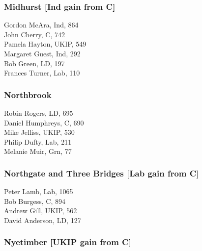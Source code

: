 \documentclass[a4paper,openany,10pt]{book}
\begin{document}
\subsubsection*{Midhurst \hspace*{\fill}\nolinebreak[1]%
\enspace\hspace*{\fill}
[Ind gain from C]}



Gordon McAra, Ind, 864\\
John Cherry, C, 742\\
Pamela Hayton, UKIP, 549\\
Margaret Guest, Ind, 292\\
Bob Green, LD, 197\\
Frances Turner, Lab, 110\\


\subsubsection*{Northbrook}



Robin Rogers, LD, 695\\
Daniel Humphreys, C, 690\\
Mike Jelliss, UKIP, 530\\
Philip Dufty, Lab, 211\\
Melanie Muir, Grn, 77\\


\subsubsection*{Northgate and Three Bridges \hspace*{\fill}\nolinebreak[1]%
\enspace\hspace*{\fill}
[Lab gain from C]}



Peter Lamb, Lab, 1065\\
Bob Burgess, C, 894\\
Andrew Gill, UKIP, 562\\
David Anderson, LD, 127\\


\subsubsection*{Nyetimber \hspace*{\fill}\nolinebreak[1]%
\enspace\hspace*{\fill}
[UKIP gain from C]}
\end{document}
